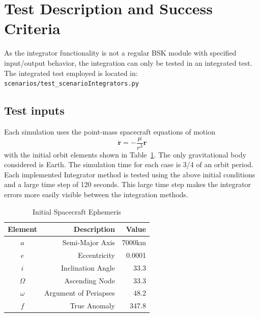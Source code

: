 
\section{Test Description and Success Criteria}

As the integrator functionality is not a regular BSK module with specified input/output behavior, the integration can only be tested in an integrated test.  
The integrated test employed is located in:\\

{\tt scenarios/test\_scenarioIntegrators.py}
\\

\subsection{Test inputs}
Each simulation uses the point-mass spacecraft equations of motion
\begin{equation}
	\ddot{\bm r} = - \frac{\mu}{r^{3}}{\bm r}
\end{equation}
with the initial orbit elements shown in Table~\ref{tbl:oeInitial}.  The only gravitational body considered is Earth.  The simulation time for each case is 3/4 of an orbit period.  Each implemented Integrator method is tested using the above initial conditions and a large time step of 120 seconds.  This large time step makes the integrator errors more easily visible between the integration methods.  


\begin{table}[htbp]
	\caption{Initial Spacecraft Ephemeris}
	\label{tbl:oeInitial}
	\centering \fontsize{10}{10}\selectfont
	\begin{tabular}{c | r | r } %
		\hline 
		\hline 
		Element    & Description & Value \\
		\hline 
		$a$      & Semi-Major Axis & 7000km \\
		$e$ & Eccentricity     &  0.0001 \\
		$i$       & Inclination Angle  & 33.3\dg \\
		$\Omega$       & Ascending Node   & 33.3\dg \\
		$\omega$       & Argument of Periapses  & 48.2\dg \\
		$f$       & True Anomaly   & 347.8\dg \\
		\hline
		\hline
	\end{tabular}
\end{table}



